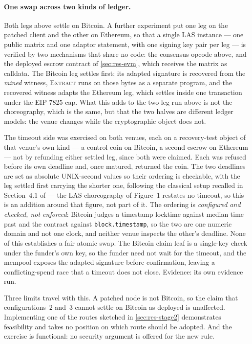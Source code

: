 \paragraph{One swap across two kinds of ledger.}
Both legs above settle on Bitcoin. A further experiment put one leg on the patched client
and the other on Ethereum, so that a single LAS instance --- one public matrix and one
adaptor statement, with one signing key pair per leg --- is verified by two mechanisms that
share no code: the consensus opcode above, and the deployed escrow contract of
\cref{sec:res-evm}, which receives the matrix as calldata. The Bitcoin leg settles first;
its adapted signature is recovered from the \emph{mined} witness, \textsc{Extract} runs on
those bytes as a separate program, and the recovered witness adapts the Ethereum leg, which
settles inside one transaction under the EIP-7825 cap. What this adds to the two-leg run
above is not the choreography, which is the same, but that the two halves are different
ledger models: the venue changes while the cryptographic object does not.

The timeout side was exercised on both venues, each on a recovery-test object of that
venue's own kind --- a control coin on Bitcoin, a second escrow on Ethereum --- not by refunding either settled leg, since both were claimed. Each was refused before its own
deadline and, once matured, returned the coin. The two deadlines are set as absolute
UNIX-second values so their ordering is checkable, with the leg settled first carrying the
shorter one, following the classical setup recalled in Section~4.1 of
\cite{esgin2020post} --- the LAS choreography of Figure~1 restates no timeout, so this is an
addition around that figure, not part of it. The ordering is \emph{configured and
checked, not enforced}: Bitcoin judges a timestamp locktime against median time past and
the contract against \texttt{block.timestamp}, so the two are one numeric domain and not
one clock, and neither venue inspects the other's deadline. None of this establishes a fair
atomic swap. The Bitcoin claim leaf is a single-key check under the funder's own key, so the
funder need not wait for the timeout, and the mempool exposes the adapted signature before
confirmation, leaving a conflicting-spend race that a timeout does not close. Evidence:
its own evidence run.

Three limits travel with this. A patched node is not Bitcoin, so the claim that
configurations~2 and~3 cannot settle on Bitcoin as deployed is unaffected. Implementing one
of the routes sketched in \cref{sec:res-stage2} demonstrates feasibility and takes no
position on which route should be adopted. And the exercise is functional: no security
argument is offered for the new rule.

